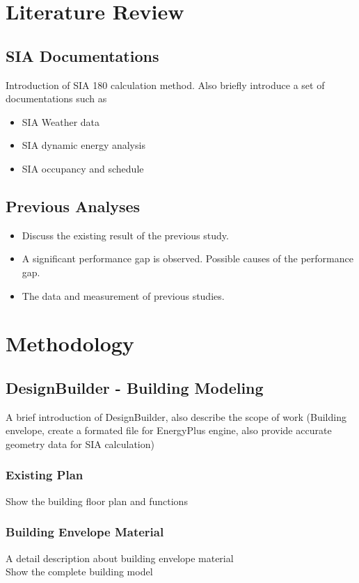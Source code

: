 \documentclass[11pt, a4paper]{article}
\theoremstyle{definition}
\begin{document}
\section{Literature Review}
	\subsection{SIA Documentations}
		Introduction of SIA 180 calculation method. Also briefly introduce a set of documentations such as 
		\begin{itemize}
			\item SIA Weather data
			\item SIA dynamic energy analysis
			\item SIA occupancy and schedule
		\end{itemize}
		

	\subsection{Previous Analyses}
		\begin{itemize}
			\item Discuss the existing result of the previous study. 
			\item A significant performance gap is observed. Possible causes of the performance gap.
			\item The data and measurement of previous studies.
		\end{itemize}
		 


\section{Methodology}
	\subsection{DesignBuilder - Building Modeling}
		A brief introduction of DesignBuilder, also describe the scope of work (Building envelope, create a formated file for EnergyPlus engine, also provide accurate geometry data for SIA calculation)
		\subsubsection{Existing Plan}
		Show the building floor plan and functions
		\subsubsection{Building Envelope Material}
		A detail description about building envelope material\\
		Show the complete building model
\end{document}
